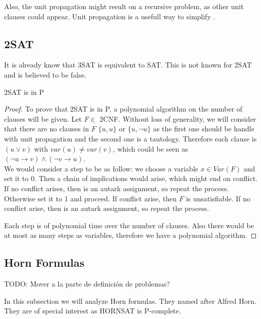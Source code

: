 Also, the unit propagation might result on a recursive problem, as other unit clauses could appear. Unit propagation is a usefull way to simplify . \\ 






\subsection{2SAT}
It is already know that 3SAT is equivalent to SAT. This is not known for 2SAT and is believed to be false.

\begin{proposition}
  2SAT is in P 
\end{proposition}
\begin{proof}

  To prove that 2SAT is in P, a polynomial algorithm on the number of clauses will be given. Let $F \in$ 2CNF.  Without loss of generality, we will consider that there are no clauses in $F$ $\{u,u\}$ or $\{u,\neg u\}$ as the first one should be handle with unit propagation and the second one is a tautology. Therefore each clause is $(u \vee v)$ with $var(u) \ne var(v)$, which could be seen as $(\neg u \rightarrow v) \wedge (\neg v \rightarrow u)$.\\


  
  We would consider a step to be as follow: we choose a variable $x \in Var(F)$ and set it to 0. Then a chain of implications would arise, which might end on conflict. If no conflict arises, then is an autark assignment, so repeat the process. Otherwise set it to 1 and proceed. If conflict arise, then $F$ is unsatisfiable. If no conflict arise, then is an autark assignment, so repeat the process.
  

  Each step is of polynomial time over the number of clauses. Also there would be at most as many steps as variables, therefore we have a polynomial algorithm.
  
 
\end{proof}

\subsection{Horn Formulas}


TODO: Mover a la parte de definición de problemas?

In this subsection we will analyze Horn formulas. They named after Alfred Horn\cite{horn1951sentences}. They are of special interest as HORNSAT is P-complete.


